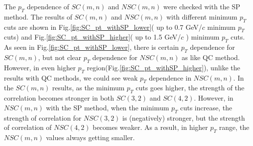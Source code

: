   The $p_T$ dependence of $SC(m,n)$ and $NSC(m,n)$ were checked with the SP method. The results of $SC(m,n)$ and $NSC(m,n)$ with different minimum $p_T$ cuts are shown in Fig.\ref{fig:SC_pt_withSP_lower}( up to 0.7 GeV/$c$ minimum $p_T$ cuts) and Fig.\ref{fig:SC_pt_withSP_higher}( up to 1.5 GeV/$c$ ) minimum $p_T$ cuts. As seen in Fig.\ref{fig:SC_pt_withSP_lower}, there is certain $p_T$ dependence for $SC(m,n)$, but not clear $p_T$ dependence for  $NSC(m,n)$ as like QC method. However, in even higher $p_T$ region(Fig.\ref{fig:SC_pt_withSP_higher}), unlike the results with QC methods, we could see weak $p_T$ dependence in  $NSC(m,n)$. In the $SC(m,n)$ results, as the minimum $p_T$ cuts goes higher, the strength of the correlation becomes stronger in both $SC(3,2)$ and $SC(4,2)$. However, in $NSC(m,n)$ with the SP method, when the minimum $p_T$ cuts increase, the strength of correlation for $NSC(3,2)$ is (negatively) stronger, but the strength of correlation of $NSC(4,2)$ becomes weaker. As a result, in higher $p_T$ range, the $NSC(m,n)$ values always getting smaller.


